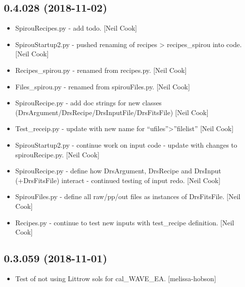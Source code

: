 \documentclass[a4paper,10pt,english]{report}
\begin{document}
\subsection{0.4.028 (2018-11-02)}
\label{\detokenize{misc/changelog:id270}}\begin{itemize}
\item {} 
SpirouRecipes.py - add todo. {[}Neil Cook{]}

\item {} 
SpirouStartup2.py - pushed renaming of recipes \textendash{}\textgreater{} recipes\_spirou into
code. {[}Neil Cook{]}

\item {} 
Recipes\_spirou.py - renamed from recipes.py. {[}Neil Cook{]}

\item {} 
Files\_spirou.py - renamed from spirouFiles.py. {[}Neil Cook{]}

\item {} 
SpirouRecipe.py - add doc strings for new classes
(DrsArgument/DrsRecipe/DrsInputFile/DrsFitsFile) {[}Neil Cook{]}

\item {} 
Test\_receip.py - update with new name for “ufiles”\textendash{}\textgreater{}”filelist” {[}Neil
Cook{]}

\item {} 
SpirouStartup2.py - continue work on input code - update with changes
to spirouRecipe.py. {[}Neil Cook{]}

\item {} 
SpirouRecipe.py - define how DrsArgument, DrsRecipe and DrsInput
(+DrsFitsFile) interact - continued testing of input redo. {[}Neil Cook{]}

\item {} 
SpirouFiles.py - define all raw/pp/out files as instances of
DrsFitsFile. {[}Neil Cook{]}

\item {} 
Recipes.py - continue to test new inputs with test\_recipe definition.
{[}Neil Cook{]}

\end{itemize}


\subsection{0.3.059 (2018-11-01)}
\label{\detokenize{misc/changelog:id271}}\begin{itemize}
\item {} 
Test of not using Littrow sols for cal\_WAVE\_EA. {[}melissa-hobson{]}

\end{itemize}
\end{document}
